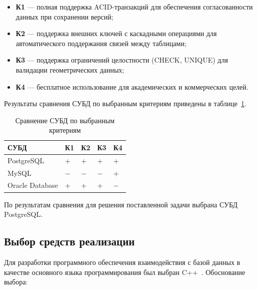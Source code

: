\begin{itemize}
    \item \textbf{К1} --- полная поддержка ACID-транзакций для обеспечения согласованности данных при сохранении версий;
    \item \textbf{К2} --- поддержка внешних ключей с каскадными операциями для автоматического поддержания связей между таблицами;
    \item \textbf{К3} --- поддержка ограничений целостности (CHECK, UNIQUE) для валидации геометрических данных;
    \item \textbf{К4} --- бесплатное использование для академических и коммерческих целей.
\end{itemize}

\noindent
\hspace{1.25cm}
Результаты сравнения СУБД по выбранным критериям приведены в таблице~\ref{tab:dbms_comparison}.

\begin{table}[H]
    \captionsetup{justification=raggedright, singlelinecheck=false}
    \caption{Сравнение СУБД по выбранным критериям}
    \label{tab:dbms_comparison}
    \begin{tabularx}{\textwidth}{|l|>{\centering\arraybackslash}X|>{\centering\arraybackslash}X|>{\centering\arraybackslash}X|>{\centering\arraybackslash}X|}
        \hline
        \textbf{СУБД} & \textbf{К1} & \textbf{К2} & \textbf{К3} & \textbf{К4} \\ \hline
        PostgreSQL & + & + & + & + \\ \hline
        MySQL & $-$ & $-$ & $-$ & + \\ \hline
        Oracle Database & + & + & + & $-$ \\ \hline
    \end{tabularx}
\end{table}

\noindent
\hspace{1.25cm}
По результатам сравнения для решения поставленной задачи выбрана СУБД PostgreSQL.

\subsection{Выбор средств реализации}

\noindent
\hspace{1.25cm}
Для разработки программного обеспечения взаимодействия с базой данных в качестве основного языка программирования был выбран C++~\cite{cpp}. Обоснование выбора:


